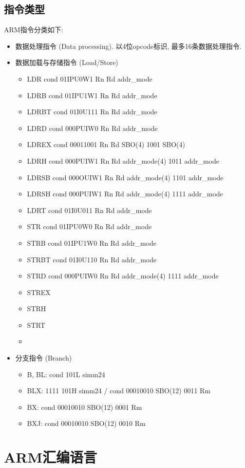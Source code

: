 \documentclass[10pt]{book}
\begin{document}
\section{指令类型}
ARM指令分类如下:
\begin{itemize}
  \item 数据处理指令 (Data processing). 以4位opcode标识, 最多16条数据处理指令.
  \item 数据加载与存储指令 (Load/Store)
  \begin{itemize}
    \item LDR    cond 01IPU0W1 Rn Rd addr\_mode
    \item LDRB   cond 01IPU1W1 Rn Rd addr\_mode
    \item LDRBT  cond 01I0U111 Rn Rd addr\_mode
    \item LDRD   cond 000PUIW0 Rn Rd addr\_mode
    \item LDREX  cond 00011001 Rn Rd SBO(4) 1001 SBO(4)
    \item LDRH   cond 000PUIW1 Rn Rd addr\_mode(4) 1011 addr\_mode
    \item LDRSB  cond 000OUIW1 Rn Rd addr\_mode(4) 1101 addr\_mode
    \item LDRSH  cond 000PUIW1 Rn Rd addr\_mode(4) 1111 addr\_mode
    \item LDRT   cond 01I0U011 Rn Rd addr\_mode
    \item STR    cond 01IPU0W0 Rn Rd addr\_mode
    \item STRB   cond 01IPU1W0 Rn Rd addr\_mode
    \item STRBT  cond 01I0U110 Rn Rd addr\_mode
    \item STRD   cond 000PUIW0 Rn Rd addr\_mode(4) 1111 addr\_mode
    \item STREX  
    \item STRH
    \item STRT
    \item 
  \end{itemize}
  \item 分支指令 (Branch)
  \begin{itemize}
    \item B, BL: cond 101L simm24
    \item BLX: 1111 101H simm24 / cond 00010010 SBO(12) 0011 Rm
    \item BX: cond 00010010 SBO(12) 0001 Rm
    \item BXJ: cond 00010010 SBO(12) 0010 Rm
  \end{itemize}
\end{itemize}

\chapter{ARM汇编语言}
\end{document}
